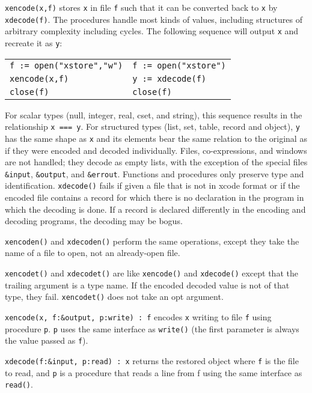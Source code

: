 \texttt{xencode(x,f)} stores \texttt{x} in file
\texttt{f} such that it can be converted back to \texttt{x} by
\texttt{xdecode(f)}. The procedures handle most kinds of values,
including structures of arbitrary complexity including cycles. The
following sequence will output \texttt{x} and recreate it as
\texttt{y}:

\begin{tabular}{m{3.0in}m{3.0in}}
\texttt{f := open("xstore","w")} & \texttt{f := open("xstore")} \\
\texttt{xencode(x,f)}            & \texttt{y := xdecode(f)} \\
\texttt{close(f)}                & \texttt{close(f)} \\
\end{tabular}

\noindent For scalar types (null, integer,
real, cset, and string), this sequence results in the relationship
\texttt{x === y}. For structured types (list, set, table, record and object),
\texttt{y} has the same
shape as \texttt{x} and its elements bear the same
relation to the original as if they were encoded and decoded
individually. Files, co-expressions, and windows are not handled;
they decode as empty lists, with the exception of the special files
\texttt{\&input}, \texttt{\&output}, and \texttt{\&errout}.
Functions and procedures only
preserve type and identification. \texttt{xdecode()} fails if given a file
that is not in xcode format or if the encoded file contains a record
for which there is no declaration in the program in which the decoding
is done. If a record is declared differently in the encoding
and decoding programs, the decoding may be bogus.

\texttt{xencoden()} and \texttt{xdecoden()} perform the same operations,
except they take the name of a file to open, not an already-open file.

\texttt{xencodet()} and \texttt{xdecodet()} are like \texttt{xencode()}
and \texttt{xdecode()} except that the trailing argument is a type
name. If the encoded decoded value is not of that type, they fail.
\texttt{xencodet()} does not take an opt argument. 

\texttt{xencode(x, f:\&output, p:write) : f} encodes \texttt{x} writing
to file \texttt{f} using procedure \texttt{p}. \texttt{p} uses
the same interface as \texttt{write()} (the first
parameter is always the value passed as \texttt{f}).

\texttt{xdecode(f:\&input, p:read) : x} returns the restored object
where \texttt{f} is the file to read, and \texttt{p} is a procedure
that reads a line from f using the same interface as \texttt{read()}.

